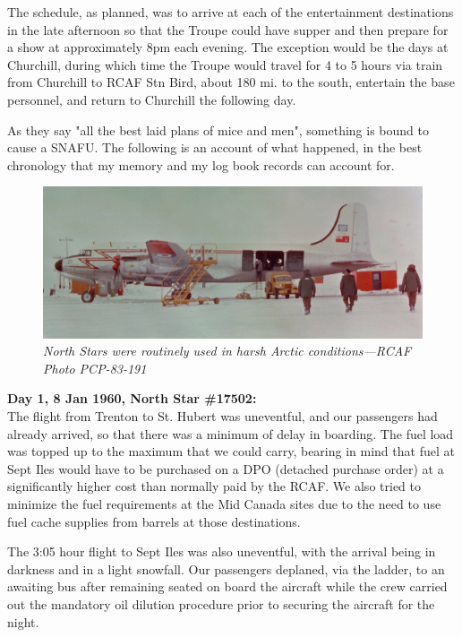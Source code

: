 The schedule, as planned, was to arrive at each of the entertainment
destinations in the late afternoon so that the Troupe could have supper
and then prepare for a show at approximately 8pm each evening. The
exception would be the days at Churchill, during which time the Troupe
would travel for 4 to 5 hours via train from Churchill to RCAF Stn
Bird, about 180 mi. to the south, entertain the base personnel, and
return to Churchill the following day.

As they say "all the best laid plans of mice and men", something is
bound to cause a SNAFU. The following is an account of what happened,
in the best chronology that my memory and my log book records can
account for.\\

\begin{figure}[httb]
   \vspace{2em}
   \centering
   \includegraphics [scale=0.5]{alert-PCP-83-191_cropped.png}
   \caption*{\small \em North Stars were routinely used in harsh Arctic conditions---RCAF Photo PCP-83-191}
   \label{fig:wall-two}
\end{figure}

\noindent\textbf{Day 1, 8 Jan 1960, North Star \#17502:}\\

The flight from Trenton to St. Hubert was uneventful, and our
passengers had already arrived, so that there was a minimum of delay in
boarding. The fuel load was topped up to the maximum that we could
carry, bearing in mind that fuel at Sept Iles would have to be
purchased on a DPO (detached  purchase order) at a significantly higher
cost than normally paid by the RCAF. We also tried to minimize the fuel
requirements at the Mid Canada sites due to the need to use fuel cache
supplies from barrels at those destinations.

The 3:05 hour flight to Sept Iles was also uneventful, with the arrival
being in darkness and in a light snowfall. Our passengers deplaned, via
the ladder, to an awaiting bus after remaining seated on board the
aircraft while the crew carried out the mandatory oil dilution
procedure prior to securing the aircraft for the night.\\

